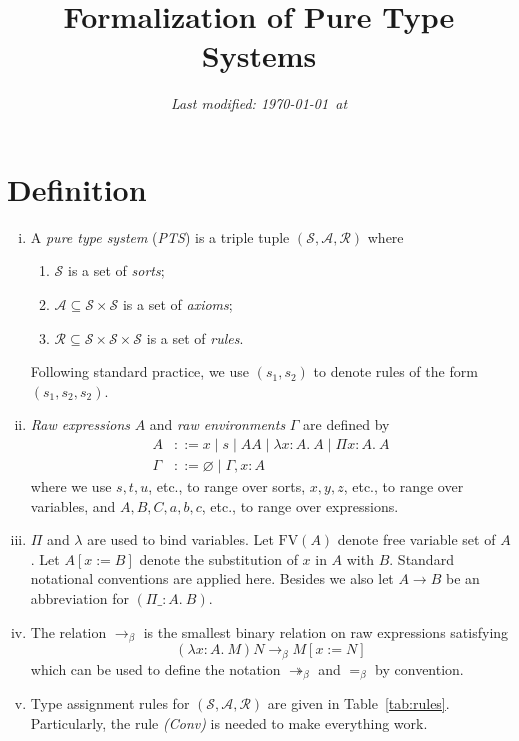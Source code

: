 \documentclass[oneside,a4paper]{article}
\title{\bf Formalization of Pure Type Systems}
\author{}
\date{\small \it Last modified: \today\ at \currenttime}
\numberwithin{equation}{section}
\begin{document}
\maketitle

\section{Definition}
\begin{enumerate}[(i)]
\item A \emph{pure type system} (\emph{PTS}) is a triple tuple
  $(\mathcal{S},\mathcal{A},\mathcal{R})$ where

  \begin{enumerate}
  \item $\mathcal{S}$ is a set of \emph{sorts};
  \item $\mathcal{A}\subseteq \mathcal{S} \times \mathcal{S}$ is a set
    of \emph{axioms};
  \item
    $\mathcal{R}\subseteq \mathcal{S} \times \mathcal{S} \times
    \mathcal{S}$ is a set of \emph{rules}.
  \end{enumerate}

Following standard practice, we use $(s_{1}, s_{2})$ to denote rules
of the form $(s_{1}, s_{2}, s_{2})$.

\item \emph{Raw expressions} $A$ and \emph{raw environments} $\Gamma$
  are defined by
  \begin{align*}
    A &::= x \mid s \mid AA \mid \lambda x:A.\ A \mid \Pi x:A.\ A\\
    \Gamma &::= \varnothing \mid \Gamma,x:A
  \end{align*}
  where we use $s,t,u$, etc., to range over sorts, $x,y,z$, etc., to
  range over variables, and $A,B,C,a,b,c$, etc., to range over
  expressions.

\item $\Pi$ and $\lambda$ are used to bind variables. Let
  $\mathrm{FV}(A)$ denote free variable set of $A$. Let $A[x:=B]$
  denote the substitution of $x$ in $A$ with $B$. Standard notational
  conventions are applied here. Besides we also let $A \to B$ be an
  abbreviation for $(\Pi \_:A.\ B)$.

\item The relation $\to _ \beta$ is the smallest binary relation on
  raw expressions satisfying
  \[ (\lambda x:A.\ M)N \to _ \beta M[x:=N] \]
  which can be used to define the notation $\twoheadrightarrow_\beta$
  and $=_\beta$ by convention.

\item Type assignment rules for
  $(\mathcal{S},\mathcal{A},\mathcal{R})$ are given in
  Table~\ref{tab:rules}. Particularly, the rule \emph{(Conv)} is
  needed to make everything work.

\end{enumerate}
\end{document}
